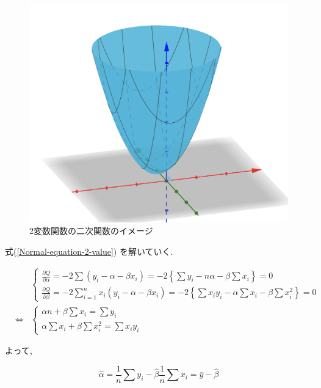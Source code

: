 \documentclass{jsarticle}
\theoremstyle{plain}
\begin{document}
  \begin{figure}[htbp]
    \centering
    \includegraphics[scale=0.5]{img/Quadratic-function-of-bivariate-function.png}
    \caption{2変数関数の二次関数のイメージ}
    \label{fig:Quadratic-function-of-bivariate-function}
  \end{figure}

  式(\ref{Normal-equation-2-value}) を解いていく.

  \begin{eqnarray}
    &&
    \begin{cases}
      \frac{\partial Q}{\partial \alpha} = -2 \sum (y_i - \alpha - \beta x_i) = -2 \left\{ \sum y_i - n\alpha - \beta \sum x_i \right\} = 0 \\
      \frac{\partial Q}{\partial \beta} = -2\sum_{i=1}^n x_i (y_i - \alpha - \beta x_i) = -2 \left\{ \sum x_i y_i  - \alpha \sum x_i - \beta \sum x_i^2 \right\} = 0
    \end{cases} \\
    &\Leftrightarrow&
    \begin{cases}
      \alpha n + \beta \sum x_i = \sum y_i \\
      \alpha \sum x_i + \beta \sum x_i^2 = \sum x_i y_i
    \end{cases}
  \end{eqnarray}

  よって,

  \begin{equation}
    \hat{\alpha} = \frac{1}{n} \sum y_i - \hat{\beta} \frac{1}{n} \sum x_i = \bar{y} - \hat{\beta}
  \end{equation}
\end{document}
